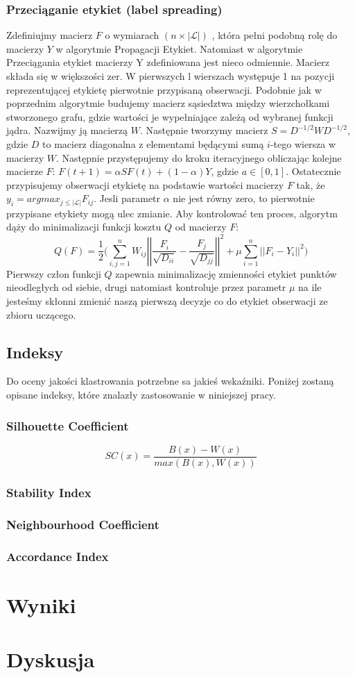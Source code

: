 \documentclass{article}
\begin{document}
\subsubsection{Przeciąganie etykiet (label spreading)}
Zdefiniujmy macierz \(F\) o wymiarach \((n \times |\mathcal{L}|)\) , która pełni podobną rolę do macierzy \(Y\) w algorytmie Propagacji Etykiet.
Natomiast w algorytmie Przeciągania etykiet macierzy Y zdefiniowana jest nieco odmiennie.
Macierz składa się w większości zer. W pierwszych l wierszach występuje 1 na pozycji reprezentującej etykietę pierwotnie przypisaną obserwacji.
Podobnie jak w poprzednim algorytmie budujemy macierz sąsiedztwa między wierzchołkami stworzonego grafu, gdzie wartości je wypełniające zależą od wybranej funkcji jądra.
Nazwijmy ją macierzą \(W\). 
Następnie tworzymy macierz \(S = D^{-1/2}WD^{-1/2}\), gdzie \(D\) to macierz diagonalna z elementami będącymi sumą \(i\)-tego wiersza w macierzy \(W\).
Następnie przystępujemy do kroku iteracyjnego obliczając kolejne macierze \(F\): \(F(t+1) = \alpha SF(t) + (1 - \alpha)Y\), gdzie \(a \in [0,1]\).
Ostatecznie przypisujemy obserwacji etykietę na podstawie wartości macierzy \(F\) tak, że \(y_i = argmax_{j\leqslant |\mathcal{L}|} F_{ij}\).
Jesli parametr \(\alpha\) nie jest równy zero, to pierwotnie przypisane etykiety mogą ulec zmianie.
Aby kontrolować ten proces, algorytm dąży do minimalizacji funkcji kosztu \(Q\) od macierzy \(F\):
\[Q(F) = \frac{1}{2}\bigg(\sum\limits^n_{i,j=1}W_{ij}\left|\left| \frac{F_i}{\sqrt{D_{ii}}} -
\frac{F_j}{\sqrt{D_{jj}}}\right|\right|^2 + \mu\sum\limits^n_{i=1}
\left|\left|F_i - Y_i\right|\right|^2 \bigg)\]
Pierwszy człon funkcji \(Q\) zapewnia minimalizację zmienności etykiet punktów nieodległych od siebie, drugi natomiast kontroluje przez parametr \(\mu\) na ile jesteśmy skłonni zmienić naszą pierwszą decyzje co do etykiet obserwacji ze zbioru uczącego.	
\subsection{Indeksy}
Do oceny jakości klastrowania potrzebne sa jakieś wskaźniki.
Poniżej zostaną opisane indeksy, które znalazły zastosowanie w niniejszej pracy.

\subsubsection{Silhouette Coefficient}


\[SC(x) = \frac{B(x) - W(x)}{max(B(x),W(x))}\]
\subsubsection{Stability Index}

\subsubsection{Neighbourhood Coefficient}


\subsubsection{Accordance Index}
\section{Wyniki}
\section{Dyskusja}



\end{document}
